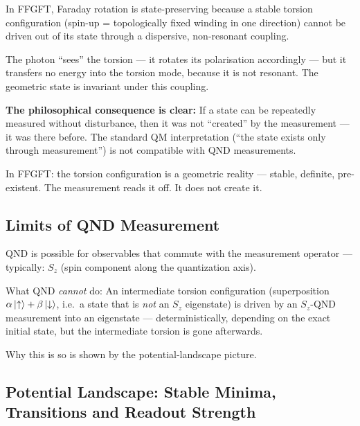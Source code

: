 \begin{foundation}
In FFGFT, Faraday rotation is state-preserving
because a stable torsion configuration
(spin-up = topologically fixed winding in one direction)
cannot be driven out of its state through a dispersive,
non-resonant coupling.

The photon ``sees'' the torsion --- it rotates its
polarisation accordingly --- but it transfers no
energy into the torsion mode, because it is not resonant.
The geometric state is invariant under this coupling.

\textbf{The philosophical consequence is clear:}
If a state can be repeatedly measured without disturbance,
then it was not ``created'' by the measurement ---
it was there before.
The standard QM interpretation
(``the state exists only through measurement'')
is not compatible with QND measurements.

In FFGFT: the torsion configuration is a
geometric reality --- stable, definite, pre-existent.
The measurement reads it off. It does not create it.
\end{foundation}

\subsection{Limits of QND Measurement}

QND is possible for observables that commute with the
measurement operator --- typically: $S_z$ (spin component
along the quantization axis).

What QND \emph{cannot} do:
An intermediate torsion configuration
(superposition $\alpha\left|\uparrow\right\rangle + \beta\left|\downarrow\right\rangle$,
i.e.~a state that is \emph{not} an $S_z$ eigenstate)
is driven by an $S_z$-QND measurement into an eigenstate
--- deterministically, depending on the exact
initial state, but the intermediate torsion is gone afterwards.

Why this is so is shown by the potential-landscape picture.

\subsection{Potential Landscape: Stable Minima, Transitions and Readout Strength}

